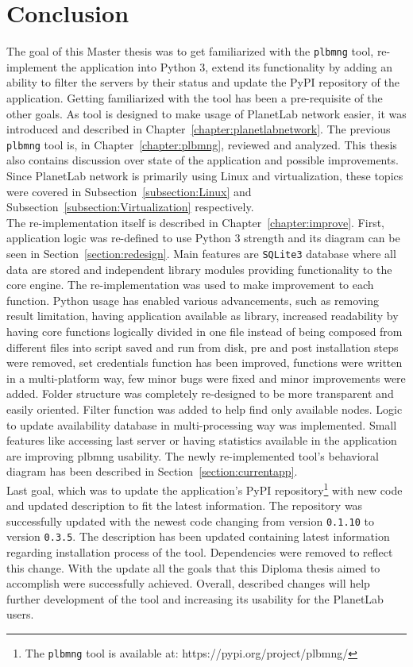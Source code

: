 \chapter{Conclusion}
The goal of this Master thesis was to get familiarized with the \texttt{plbmng} tool, re-implement the application into Python 3, extend its functionality by adding an ability to filter the servers by their status and update the PyPI repository of the application. Getting familiarized with the tool has been a pre-requisite of the other goals. As tool is designed to make usage of PlanetLab network easier, it was introduced and described in Chapter~\ref{chapter:planetlabnetwork}. The previous \texttt{plbmng} tool is, in Chapter~\ref{chapter:plbmng}, reviewed and analyzed. This thesis also contains discussion over state of the application and possible improvements. Since PlanetLab network is primarily using Linux and virtualization, these topics were covered in Subsection~\ref{subsection:Linux} and Subsection~\ref{subsection:Virtualization} respectively.\\
The re-implementation itself is described in Chapter~\ref{chapter:improve}. First, application logic was re-defined to use Python 3 strength and its diagram can be seen in Section~\ref{section:redesign}. Main features are \texttt{SQLite3} database where all data are stored and independent library modules providing functionality to the core engine. The re-implementation was used to make improvement to each function. Python usage has enabled various advancements, such as removing result limitation, having application available as library, increased readability by having core functions logically divided in one file instead of being composed from different files into script saved and run from disk, pre and post installation steps were removed, set credentials function has been improved, functions were written in a multi-platform way, few minor bugs were fixed and minor improvements were added. Folder structure was completely re-designed to be more transparent and easily oriented. Filter function was added to help find only available nodes. Logic to update availability database in multi-processing way was implemented. Small features like accessing last server or having statistics available in the application are improving plbmng usability. The newly re-implemented tool's behavioral diagram has been described in Section~\ref{section:currentapp}.\\
Last goal, which was to update the application's PyPI repository\footnote{The \texttt{plbmng} tool is available at: https://pypi.org/project/plbmng/} with new code and updated description to fit the latest information. The repository was successfully updated with the newest code changing from version \texttt{0.1.10} to version \texttt{0.3.5}. The description has been updated containing latest information regarding installation process of the tool. Dependencies were removed to reflect this change. With the update all the goals that this Diploma thesis aimed to accomplish were successfully achieved. Overall, described changes will help further development of the tool and increasing its usability for the PlanetLab users.
